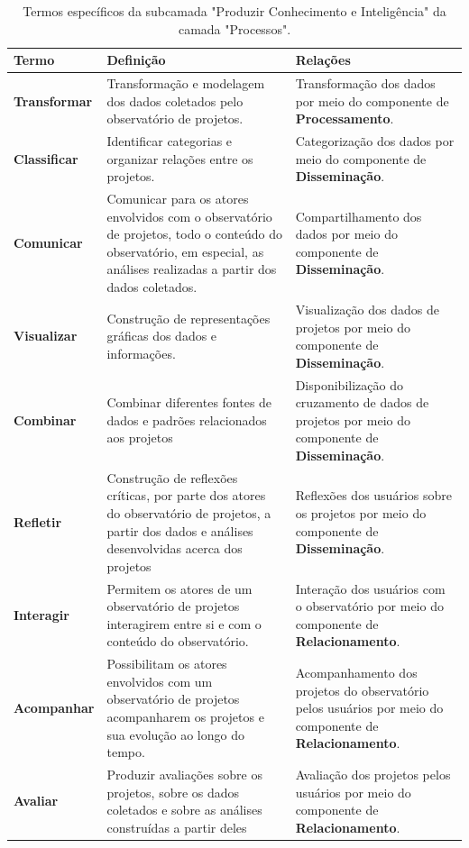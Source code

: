 \begin{apendicesenv}
\begin{table}[H]
\centering
\caption{Termos específicos da subcamada "Produzir Conhecimento e Inteligência" da camada "Processos".}
\begin{tabularx}{\textwidth}{|l|X|X|}
\hline
\textbf{Termo} & \textbf{Definição} & \textbf{Relações} \\ \hline
\textbf{Transformar}   & Transformação e modelagem dos dados coletados pelo observatório de projetos.
 & Transformação dos dados por meio do componente de \textbf{Processamento}. \\ \hline
\textbf{Classificar}   & Identificar categorias e organizar relações entre os projetos. & Categorização dos dados por meio do componente de \textbf{Disseminação}. \\ \hline
\textbf{Comunicar}  & Comunicar para os
atores envolvidos com o observatório de projetos, todo o conteúdo do observatório, em
especial, as análises realizadas a partir dos dados coletados.
 & Compartilhamento dos dados por meio do componente de \textbf{Disseminação}. \\ \hline
\textbf{Visualizar}   & Construção de representações gráficas dos dados e informações. & Visualização dos dados de projetos por meio do componente de \textbf{Disseminação}. \\ \hline
\textbf{Combinar}   & Combinar diferentes fontes de dados e padrões relacionados aos projetos & Disponibilização do cruzamento de dados de projetos por meio do componente de \textbf{Disseminação}. \\ \hline
\textbf{Refletir}   &  Construção de reflexões críticas, por parte
dos atores do observatório de projetos, a partir dos dados e análises desenvolvidas acerca
dos projetos & Reflexões dos usuários sobre os projetos por meio do componente de \textbf{Disseminação}. \\ \hline
\textbf{Interagir}   & Permitem os atores de um observatório de projetos interagirem entre si e com o conteúdo do observatório. & Interação dos usuários com o observatório por meio do componente de \textbf{Relacionamento}. \\ \hline
\textbf{Acompanhar}   & Possibilitam os atores envolvidos com um observatório
de projetos acompanharem os projetos e sua evolução ao longo do tempo. & Acompanhamento dos projetos do observatório pelos usuários por meio do componente de \textbf{Relacionamento}. \\ \hline
\textbf{Avaliar}   &  Produzir avaliações sobre os projetos, sobre os
dados coletados e sobre as análises construídas a partir deles & Avaliação dos projetos pelos usuários por meio do componente de \textbf{Relacionamento}. \\ \hline

\end{tabularx}
\end{table}
\end{apendicesenv}

